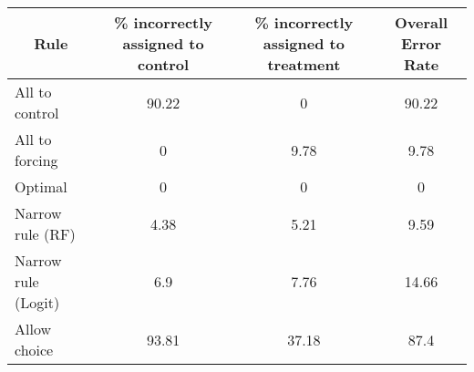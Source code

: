 \begin{tabular}{lccc}
\toprule
\multicolumn{1}{c}{Rule} & \% incorrectly assigned to control  & \% incorrectly assigned to treatment & Overall Error Rate \\
\midrule
\midrule
All to control & 90.22 & 0     & 90.22 \\
All to forcing & 0     & 9.78  & 9.78 \\
Optimal & 0     & 0     & 0 \\
Narrow rule (RF) & 4.38  & 5.21  & 9.59 \\
Narrow rule (Logit) & 6.9   & 7.76  & 14.66 \\
Allow choice & 93.81 & 37.18 & 87.4 \\
\bottomrule
\bottomrule
\end{tabular}%
